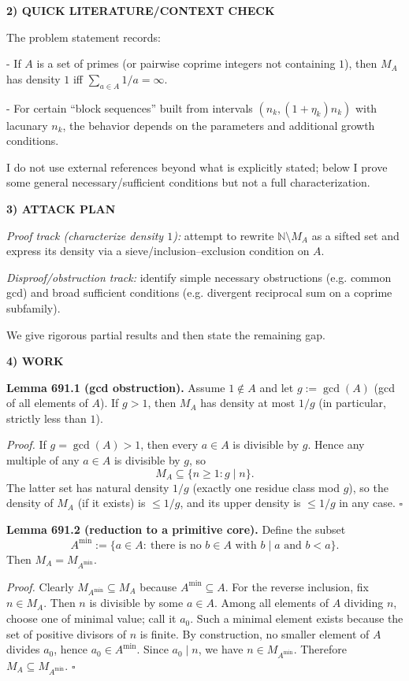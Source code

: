 \bigskip
\noindent\textbf{2) QUICK LITERATURE/CONTEXT CHECK}

The problem statement records:

- If $A$ is a set of primes (or pairwise coprime integers not containing $1$), then $M_A$ has density $1$ iff $\sum_{a\in A}1/a=\infty$.

- For certain “block sequences” built from intervals $(n_k,(1+\eta_k)n_k)$ with lacunary $n_k$, the behavior depends on the parameters and additional growth conditions.

I do not use external references beyond what is explicitly stated; below I prove some general necessary/sufficient conditions but not a full characterization.

\bigskip
\noindent\textbf{3) ATTACK PLAN}

\emph{Proof track (characterize density $1$):} attempt to rewrite $\mathbb{N}\setminus M_A$ as a sifted set and express its density via a sieve/inclusion--exclusion condition on $A$.

\emph{Disproof/obstruction track:} identify simple necessary obstructions (e.g. common gcd) and broad sufficient conditions (e.g. divergent reciprocal sum on a coprime subfamily).

We give rigorous partial results and then state the remaining gap.

\bigskip
\noindent\textbf{4) WORK}

\noindent\textbf{Lemma 691.1 (gcd obstruction).}
Assume $1\notin A$ and let $g:=\gcd(A)$ (gcd of all elements of $A$). If $g>1$, then $M_A$ has density at most $1/g$ (in particular, strictly less than $1$).

\smallskip
\noindent\emph{Proof.}
If $g=\gcd(A)>1$, then every $a\in A$ is divisible by $g$. Hence any multiple of any $a\in A$ is divisible by $g$, so
\[
M_A\subseteq \{n\ge 1: g\mid n\}.
\]
The latter set has natural density $1/g$ (exactly one residue class mod $g$), so the density of $M_A$ (if it exists) is $\le 1/g$, and its upper density is $\le 1/g$ in any case. \hfill$\square$

\medskip
\noindent\textbf{Lemma 691.2 (reduction to a primitive core).}
Define the subset
\[
A^{\min}:=\{a\in A:\ \text{there is no }b\in A\text{ with }b\mid a\text{ and }b<a\}.
\]
Then $M_A=M_{A^{\min}}$.

\smallskip
\noindent\emph{Proof.}
Clearly $M_{A^{\min}}\subseteq M_A$ because $A^{\min}\subseteq A$.
For the reverse inclusion, fix $n\in M_A$. Then $n$ is divisible by some $a\in A$. Among all elements of $A$ dividing $n$, choose one of minimal value; call it $a_0$. Such a minimal element exists because the set of positive divisors of $n$ is finite. By construction, no smaller element of $A$ divides $a_0$, hence $a_0\in A^{\min}$. Since $a_0\mid n$, we have $n\in M_{A^{\min}}$. Therefore $M_A\subseteq M_{A^{\min}}$. \hfill$\square$

